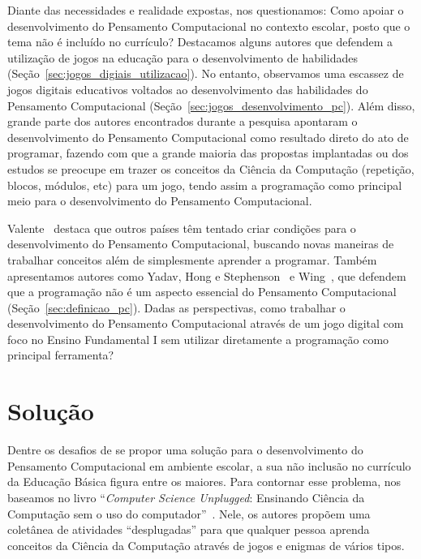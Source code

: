 Diante das necessidades e realidade expostas, nos questionamos: Como apoiar o desenvolvimento do Pensamento Computacional no contexto escolar, posto que o tema não é incluído no currículo? Destacamos alguns autores que defendem a utilização de jogos na educação para o desenvolvimento de habilidades (Seção~\ref{sec:jogos_digiais_utilizacao}). No entanto, observamos uma escassez de jogos digitais educativos voltados ao desenvolvimento das habilidades do Pensamento Computacional (Seção~\ref{sec:jogos_desenvolvimento_pc}). Além disso, grande parte dos autores encontrados durante a pesquisa apontaram o desenvolvimento do Pensamento Computacional como resultado direto do ato de programar, fazendo com que a grande maioria das propostas implantadas ou dos estudos se preocupe em trazer os conceitos da Ciência da Computação (repetição, blocos, módulos, etc) para um jogo, tendo assim a programação como principal meio para o desenvolvimento do Pensamento Computacional.

Valente~\cite{valente_integracao_2016} destaca que outros países têm tentado criar condições para o desenvolvimento do Pensamento Computacional, buscando novas maneiras de trabalhar conceitos além de simplesmente aprender a programar. Também apresentamos autores como Yadav, Hong e Stephenson~\cite{yadav_computational_2016} e Wing~\cite{wing_computational_2006}, que defendem que a programação não é um aspecto essencial do Pensamento Computacional (Seção~\ref{sec:definicao_pc}). Dadas as perspectivas, como trabalhar o desenvolvimento do Pensamento Computacional através de um jogo digital com foco no Ensino Fundamental I sem utilizar diretamente a programação como principal ferramenta?

\section{Solução} \label{sec:solucao}

Dentre os desafios de se propor uma solução para o desenvolvimento do Pensamento Computacional em ambiente escolar, a sua não inclusão no currículo da Educação Básica figura entre os maiores. Para contornar esse problema, nos baseamos no livro “\textit{Computer Science Unplugged}: Ensinando Ciência da Computação sem o uso do computador”~\cite{bell_computer_2011}. Nele, os autores propõem uma coletânea de atividades “desplugadas” para que qualquer pessoa aprenda conceitos da Ciência da Computação através de jogos e enigmas de vários tipos.

